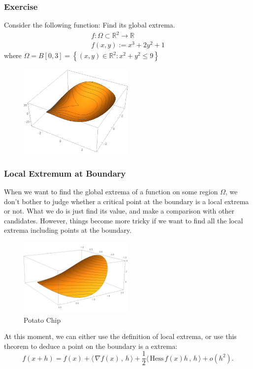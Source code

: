 \documentclass[10pt, t, allowdisplaybreaks]{beamer}
\newcommand{\scp}[2]{\langle\,#1\,,\,#2\,\rangle} \newcommand{\scpp}{\langle\,\cdot\,,\,\cdot\,\rangle}
\begin{document}
\begin{frame}
    \frametitle{Exercise}
    Consider the following function:
    Find its global extrema.
    \[
        \begin{array}{c}
            f: \Omega \subset \mathbb{R}^{2} \rightarrow \mathbb{R} \\
            f(x, y):=x^{3}+2 y^{2}+1
        \end{array}
    \]
    where $\Omega=B[0,3]=\left\{(x, y) \in \mathbb{R}^{2}: x^{2}+y^{2} \leq 9\right\}$

    \pause

    \begin{figure}[H]
        \centering
        \includegraphics[width=0.5\textwidth]{Figures/2020-07-29-15-52-27.png}
    \end{figure}
\end{frame}

\begin{frame}[allowframebreaks]
    \frametitle{Local Extremum at Boundary}
    When we want to find the global extrema of a function on some region $\Omega$, we don't bother to judge whether a critical point at the boundary is a local extrema or not. What we do is just find its value, and make a comparison with other candidates. However, things become more tricky if we want to find all the local extrema including points at the boundary.
    \begin{figure}[H]
        \centering
        \includegraphics[width=0.5\textwidth]{Figures/2020-07-29-15-28-47.png}
        \caption{Potato Chip}
    \end{figure}

    \newpage
    At this moment, we can either use the definition of local extrema, or use this theorem to deduce a point on the boundary is a extrema:
    $$
        f(x+h)=f(x)+\scp{\nabla f(x)}{h}+\frac{1}{2}\scp{\text{Hess}\,f(x)h}{h}+o(h^2).
    $$

\end{frame}
\end{document}

